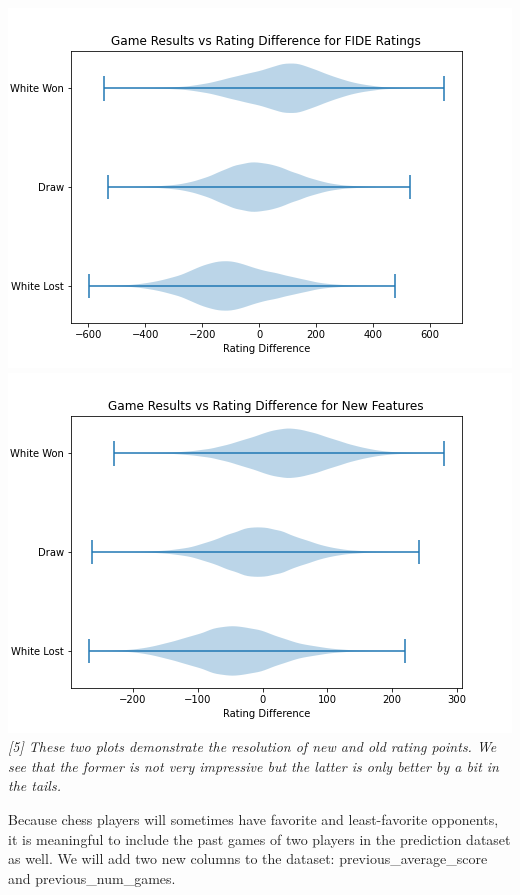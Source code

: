 \documentclass[12pt, letterpaper]{article}
\begin{document}
\begin{multicols}{2}
\setlength{\parskip}{0.0cm}
\begin{center}
\begin{scriptsize}

\includegraphics[width=\linewidth]{../figures/baseline_violin.png}
\includegraphics[width=\linewidth]{../figures/new_violin.png}
\textit{[5] These two plots demonstrate the resolution of new and old rating points. We see that the former is not very impressive but the latter is only better by a bit in the tails.}

\end{scriptsize}
\end{center}
\setlength{\parskip}{0.1cm}

Because chess players will sometimes have favorite and least-favorite opponents, it is meaningful to include the past games of two players in the prediction dataset as well. We will add two new columns to the dataset: previous\_average\_score and previous\_num\_games.

\end{multicols}
\end{document}
